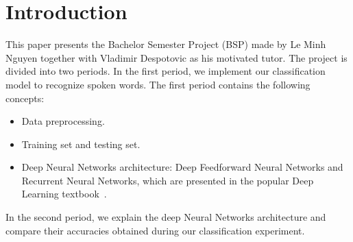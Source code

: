 
\section{Introduction}

This paper presents the Bachelor Semester Project (BSP) made by Le Minh Nguyen
together with Vladimir Despotovic as his motivated tutor. The project is divided
into two periods. In the first period, we implement our classification model to
recognize spoken words. The first period contains the following concepts:\\

\begin{itemize}
\item Data preprocessing.
\item Training set and testing set.
\item Deep Neural Networks architecture: Deep Feedforward Neural Networks and
  Recurrent Neural Networks, which are presented in the popular Deep Learning
  textbook~\cite{Goodfellow-et-al-2016}.
\end{itemize}

In the second period, we explain the deep Neural Networks architecture and compare their
accuracies obtained during our classification experiment.\\
